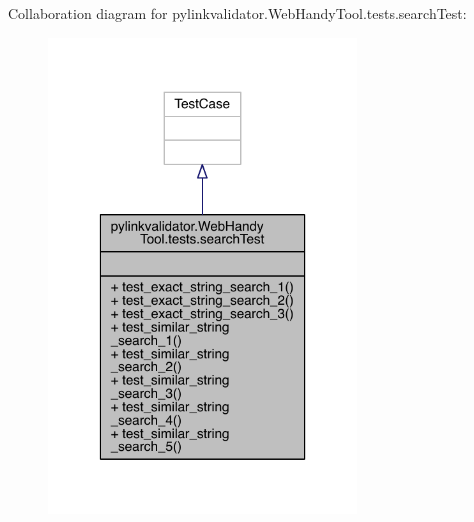 Collaboration diagram for pylinkvalidator.\+Web\+Handy\+Tool.\+tests.\+search\+Test\+:
\nopagebreak
\begin{figure}[H]
\begin{center}
\leavevmode
\includegraphics[width=232pt]{classpylinkvalidator_1_1_web_handy_tool_1_1tests_1_1search_test__coll__graph}
\end{center}
\end{figure}
